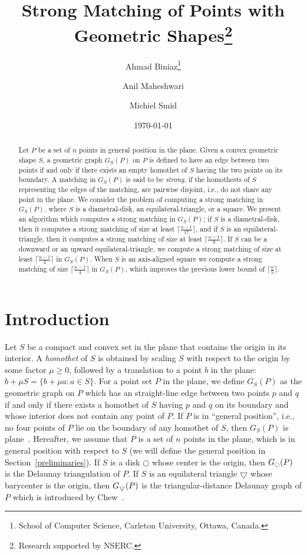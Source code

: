 \documentclass[11pt,a4paper]{article}
\title{Strong Matching of Points with Geometric Shapes\thanks{Research supported by NSERC.}}
\author{
Ahmad Biniaz\thanks{School of Computer Science, Carleton University, Ottawa, Canada.}
\and 
Anil Maheshwari\footnotemark[2]
\and 
Michiel Smid\footnotemark[2]
}
\date{\today}
\newcommand{\G}[2]{G_{#1}({#2})}
\newcommand{\disc}{\Circle}
\newcommand{\discs}{\scriptsize \Circle}
\newcommand{\trid}{\bigtriangledown}
\newcommand{\trids}{\scriptsize\bigtriangledown}
\begin{document}
\maketitle

\begin{abstract}
Let $P$ be a set of $n$ points in general position in the plane. Given a convex geometric shape $S$, a geometric graph $\G{S}{P}$ on $P$ is defined to have an edge between two points if and only if there exists an empty homothet of $S$ having the two points on its boundary. A matching in $\G{S}{P}$ is said to be {\em strong}, if the homothests of $S$ representing the edges of the matching, are pairwise disjoint, i.e., do not share any point in the plane. We consider the problem of computing a strong matching in $\G{S}{P}$, where $S$ is a diametral-disk, an equilateral-triangle, or a square. We present an algorithm which computes a strong matching in $\G{S}{P}$; if $S$ is a diametral-disk, then it computes a strong matching of size at least $\lceil \frac{n-1}{17} \rceil$, and if $S$ is an equilateral-triangle, then it computes a strong matching of size at least $\lceil \frac{n-1}{9} \rceil$. If $S$ can be a downward or an upward equilateral-triangle, we compute a strong matching of size at least $\lceil \frac{n-1}{4} \rceil$ in $\G{S}{P}$. When $S$ is an axis-aligned square we compute a strong matching of size $\lceil \frac{n-1}{4} \rceil$ in $\G{S}{P}$, which improves the previous lower bound of $\lceil \frac{n}{5} \rceil$. 
\end{abstract}

\section{Introduction}
\label{intro}

Let $S$ be a compact and convex set in the plane that contains the origin in its interior. A {\em homothet} of $S$ is obtained by scaling $S$ with respect to the origin by some factor $\mu\ge 0$, followed by a translation to a point $b$ in the plane: $b+\mu S=\{b+\mu a: a\in S\}$.
For a point set $P$ in the plane, we define $\G{S}{P}$ as the geometric graph on $P$ which has an straight-line edge between two points $p$ and $q$ if and only if there exists a homothet of $S$ having $p$ and $q$ on its boundary and whose interior does not contain any point of $P$. If $P$ is in ``general position'', i.e., no four points of $P$ lie on the boundary of any homothet of $S$, then $\G{S}{P}$ is plane~\cite{Bose2010}. Hereafter, we assume that $P$ is a set of $n$ points in the plane, which is in general position with respect to $S$ (we will define the general position in Section~\ref{preliminaries}). 
If $S$ is a disk $\disc$ whose center is the origin, then $\G{\discs}{P}$ is the Delaunay triangulation of $P$. If $S$ is an equilateral triangle $\trid$ whose barycenter is the origin, then $\G{\trids}{P}$ is the triangular-distance Delaunay graph of $P$ which is introduced by Chew~\cite{Chew1989}.
\end{document}
